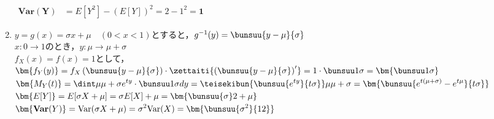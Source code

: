 \documentclass[b5paper]{jlreq}  %
\begin{document}
\begin{enumerate}[(1)\hspace{5mm}]
    $\begin{aligned}
        \bm{\textbf{Var}(Y)}&=E\left[Y^2\right]-\left(E[Y]\right)^2=2-1^2=\bm{1}
    \end{aligned}$\\





\item $y=g(x)=\sigma x+\mu\quad(0<x<1)$とすると，$g^{-1}(y)=\bunsuu{y-\mu}{\sigma}$\\

$x:0\to 1$のとき，$y:\mu\to \mu+\sigma$\\

$f_X(x)=f(x)=1$として，\\

$\begin{aligned}
    \bm{f_Y(y)}&=f_X\left(\bunsuu{y-\mu}{\sigma}\right)\cdot\zettaiti{\left(\bunsuu{y-\mu}{\sigma}\right)'}
    =1\cdot \bunsuu1\sigma=\bm{\bunsuu1\sigma}\end{aligned}$\\


$\begin{aligned}
    \bm{M_Y(t)}&
    =\dint\mu{\mu+\sigma} e^{ty}\cdot\bunsuu1\sigma dy
    =\teisekibun{\bunsuu{e^{ty}}{t\sigma}}\mu{\mu+\sigma}
    =\bm{\bunsuu{e^{t(\mu+\sigma)}-e^{t\mu}}{t\sigma}}\end{aligned}$\\

    

$\begin{aligned}
    \bm{E[Y]}&=E[\sigma X+\mu]
    =\sigma E[X]+\mu=\bm{\bunsuu{\sigma}2+\mu}
\end{aligned}$\\


$\begin{aligned}
    \bm{\textbf{Var}(Y)}&=\text{Var}(\sigma X+\mu)
    =\sigma^2\text{Var}(X)=\bm{\bunsuu{\sigma^2}{12}}
\end{aligned}$\\



\end{enumerate}

    

            
\end{document}
